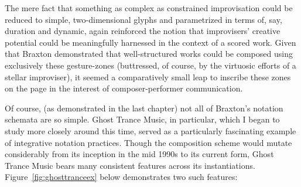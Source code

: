     The mere fact that something as complex as constrained improvisation could be reduced to simple, two-dimensional glyphs and parametrized in terms of, say, duration and dynamic, again reinforced the notion that improvisers' creative potential could be meaningfully harnessed in the context of a scored work. Given that Braxton demonstrated that well-structured works could be composed using exclusively these gesture-zones (buttressed, of course, by the virtuosic efforts of a stellar improviser), it seemed a comparatively small leap to inscribe these zones on the page in the interest of composer-performer communication.

    Of course, (as demonstrated in the last chapter) not all of Braxton's notation schemata are so simple. Ghost Trance Music, in particular, which I began to study more closely around this time, served as a particularly fascinating example of integrative notation practices. Though the composition scheme would mutate considerably from its inception in the mid 1990s to its current form, Ghost Trance Music bears many consistent features across its instantiations.\autocite{Dicker_2016} Figure~\ref{fig:ghosttranceex} below demonstrates two such features: 
    

